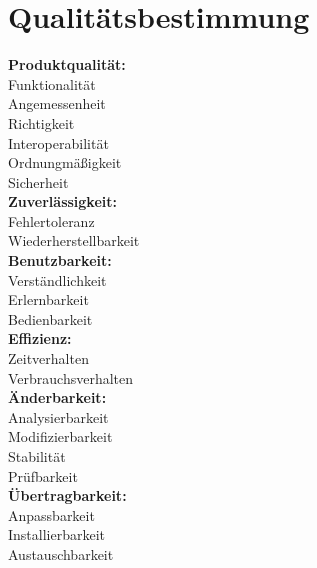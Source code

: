 \section{Qualitätsbestimmung}
\textbf{Produktqualität:}\\
Funktionalität\\
Angemessenheit\\
Richtigkeit\\
Interoperabilität\\
Ordnungmäßigkeit\\
Sicherheit\\
\textbf{Zuverlässigkeit:}\\
Fehlertoleranz\\
Wiederherstellbarkeit\\
\textbf{Benutzbarkeit:}\\
Verständlichkeit\\
Erlernbarkeit\\
Bedienbarkeit\\
\textbf{Effizienz:}\\
Zeitverhalten\\
Verbrauchsverhalten\\
\textbf{Änderbarkeit:}\\
Analysierbarkeit\\
Modifizierbarkeit\\
Stabilität\\
Prüfbarkeit\\
\textbf{Übertragbarkeit:}\\
Anpassbarkeit\\
Installierbarkeit\\
Austauschbarkeit\\